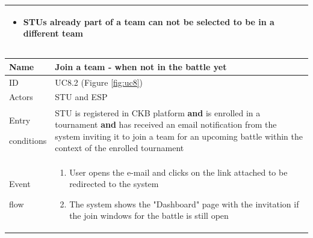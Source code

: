 \begin{center}
\begin{tabular}{| m{2cm} | m{10cm}|}
\begin{itemize}
                                    \item STUs already part of a team can not be selected to be in a different team
                                \end{itemize}                                                                                                                                                                                                                                                                                       \\ \hline
    \end{tabular}
\end{center}

\begin{center}
    \def\arraystretch{1.5}
    \begin{tabular}{| m{2cm} | m{10cm}|}
        \hline
        Name                  & Join a team - when not in the battle yet                                                                                                                                                                                                        \\ \hline
        ID                    & UC8.2 (Figure \ref{fig:uc8})                                                                                                                                                                                                                    \\ \hline
        Actors                & STU and ESP                                                                                                                                                                                                                                            \\ \hline
        Entry \par conditions & STU is registered in CKB platform \textbf{and} is enrolled in a tournament \textbf{and} has received an email notification from the system inviting it to join a team for an upcoming battle within the context of the enrolled tournament      \\ \hline
        Event \par flow       & \begin{enumerate}
                                    \item User opens the e-mail and clicks on the link attached to be redirected to the system
                                    \item The system shows the "Dashboard" page with the invitation if the join windows for the battle is still open

\end{enumerate}
\end{tabular}
\end{center}
